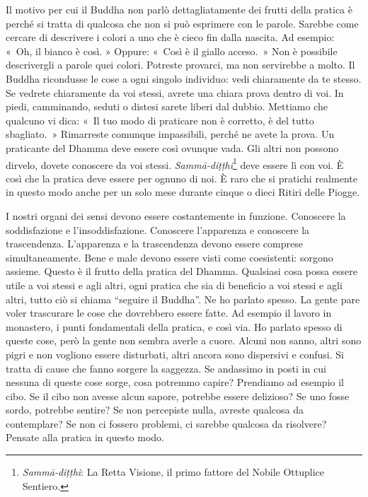 Il motivo per cui il Buddha non parlò dettagliatamente dei frutti della
pratica è perché si tratta di qualcosa che non si può esprimere con le
parole. Sarebbe come cercare di descrivere i colori a uno che è cieco
fin dalla nascita. Ad esempio: «~Oh, il bianco è così. » Oppure: «~Così
è il giallo acceso.~» Non è possibile descrivergli a parole quei colori.
Potreste provarci, ma non servirebbe a molto. Il Buddha ricondusse le
cose a ogni singolo individuo: vedi chiaramente da te stesso. Se vedrete
chiaramente da voi stessi, avrete una chiara prova dentro di voi. In
piedi, camminando, seduti o distesi sarete liberi dal dubbio. Mettiamo
che qualcuno vi dica: «~Il tuo modo di praticare non è corretto, è del
tutto sbagliato.~» Rimarreste comunque impassibili, perché ne avete la
prova. Un praticante del Dhamma deve essere così ovunque vada. Gli altri
non possono dirvelo, dovete conoscere da voi stessi.
\emph{Sammā-diṭṭhi}\footnote{\emph{Sammā-diṭṭhi}: La Retta Visione, il
  primo fattore del Nobile Ottuplice Sentiero.} deve essere lì con voi.
È così che la pratica deve essere per ognuno di noi. È raro che si
pratichi realmente in questo modo anche per un solo mese durante cinque
o dieci Ritiri delle Piogge.

I nostri organi dei sensi devono essere costantemente in funzione.
Conoscere la soddisfazione e l'insoddisfazione. Conoscere l'apparenza e
conoscere la trascendenza. L'apparenza e la trascendenza devono essere
comprese simultaneamente. Bene e male devono essere visti come
coesistenti: sorgono assieme. Questo è il frutto della pratica del
Dhamma. Qualsiasi cosa possa essere utile a voi stessi e agli altri,
ogni pratica che sia di beneficio a voi stessi e agli altri, tutto ciò
si chiama ``seguire il Buddha''. Ne ho parlato spesso. La gente pare
voler trascurare le cose che dovrebbero essere fatte. Ad esempio il
lavoro in monastero, i punti fondamentali della pratica, e così via. Ho
parlato spesso di queste cose, però la gente non sembra averle a cuore.
Alcuni non sanno, altri sono pigri e non vogliono essere disturbati,
altri ancora sono dispersivi e confusi. Si tratta di cause che fanno
sorgere la saggezza. Se andassimo in posti in cui nessuna di queste cose
sorge, cosa potremmo capire? Prendiamo ad esempio il cibo. Se il cibo
non avesse alcun sapore, potrebbe essere delizioso? Se uno fosse sordo,
potrebbe sentire? Se non percepiste nulla, avreste qualcosa da
contemplare? Se non ci fossero problemi, ci sarebbe qualcosa da
risolvere? Pensate alla pratica in questo modo.

